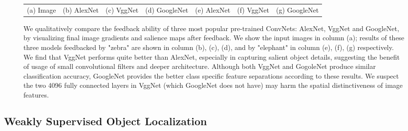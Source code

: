 \begin{figure}
\begin{center}
\begin{tabular}{ccccccc}
{\small (a) Image} &
{\small (b) AlexNet} &
{\small (c) VggNet} &
{\small (d) GoogleNet} &
{\small (e) AlexNet} &
{\small (f) VggNet} &
{\small (g) GoogleNet} \\
\end{tabular}
\caption{We qualitatively compare the feedback ability of three most popular pre-trained ConvNets: AlexNet, VggNet and GoogleNet, by visualizing final image gradients and salience maps after feedback. We show the input images in column (a); results of these three models feedbacked by "zebra" are shown in column (b), (c), (d), and by "elephant" in column (e), (f), (g) respectively. We find that VggNet performs quite better than AlexNet, especially in capturing salient object details, suggesting the benefit of usage of small convolutional filters and deeper architecture. Although both VggNet and GogoleNet produce similar classification accuracy, GoogleNet provides the better class specific feature separations according to these results. We suspect the two 4096 fully connected layers in VggNet (which GoogleNet does not have) may harm the spatial distinctiveness of image features.}
\label{fig:model_compare}
\end{center}
\end{figure}


\subsection{Weakly Supervised Object Localization}
\label{subsec:localization}

